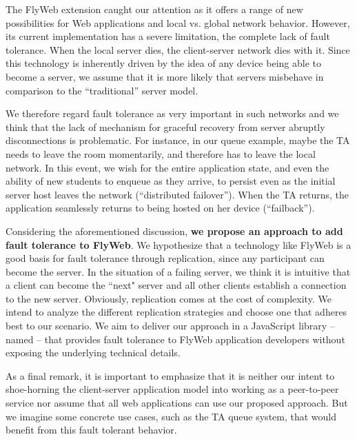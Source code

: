 The FlyWeb extension caught our attention as it offers a range of new possibilities for Web applications and local vs. global network behavior. However, its current implementation has a severe limitation, the complete lack of fault tolerance. When the local server dies, the client-server network dies with it. Since this technology is inherently driven by the idea of any device being able to become a server, we assume that it is more likely that servers misbehave in comparison to the  ``traditional'' server model. 



We therefore regard fault tolerance as very important in such networks and we think that the lack of mechanism for graceful recovery from server abruptly disconnections is problematic.
For instance, in our queue example, maybe the TA needs to leave the room momentarily, and therefore has to leave the local network. In this event, we wish for the entire application state, and even the ability of new students to enqueue as they arrive, to persist even as the initial server host leaves the network (``distributed failover''). When the TA returns, the application seamlessly returns to being hosted on her device (``failback''). 


Considering the aforementioned discussion, {\bf we propose an approach to add fault tolerance to FlyWeb}. We hypothesize that a technology like FlyWeb is a good basis for fault tolerance through replication, since any participant can become the server. In the situation of a failing server, we think it is intuitive that a client can become the ``next" server and all other clients establish a connection to the new server. Obviously, replication comes at the cost of complexity. We intend to analyze the different replication strategies and choose one that adheres best to our scenario. We aim to deliver our approach in a JavaScript library -- named {\texttt{\APIName{}}} -- that provides fault tolerance to FlyWeb application developers without exposing the underlying technical details.



As a final remark, it is important to emphasize that it is neither our intent to shoe-horning the client-server application model into working as a peer-to-peer service nor assume that all web applications can use our proposed approach. But we imagine some concrete use cases, such as the TA queue system, that would benefit from this fault tolerant behavior.